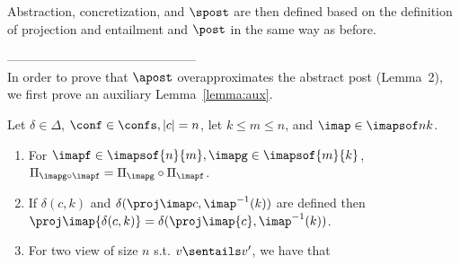
%
Abstraction, concretization, and $\spost$ are then defined based on the definition of projection and entailment and $\post$ in the same way as before.


---------------------------------------------\\
In order to prove that $\apost$ overapproximates the abstract post (Lemma~2), we first prove an auxiliary Lemma~\ref{lemma:aux}.
\begin{lemma}\label{lemma:aux}
Let $\delta\in\Delta$, 
$\conf\in\confs,|c|=n$, let $k \leq m \leq n$,
and $\imap\in \imapsof n k$.
\begin{enumerate}
\item\label{item:composition}
For $\imapf\in \imapsof {n} {m}, \imapg\in \imapsof {m} {k}$, $\Pi_{\imapg\circ\imapf} = \Pi_{\imapg} \circ \Pi_\imapf$.
\item\label{item:samepost}
If $\delta(c,k)$ and $\delta(\proj \imap c ,\imap^{-1}(k))$ are defined then
$\proj \imap {\delta (c,k)} = \delta (\proj \imap {c}, \imap^{-1}(k))$.
\item\label{item:monotonicity}
For two view of size $n$ s.t. $v\sentails v'$, we have that 
\end{enumerate}
\end{lemma}
